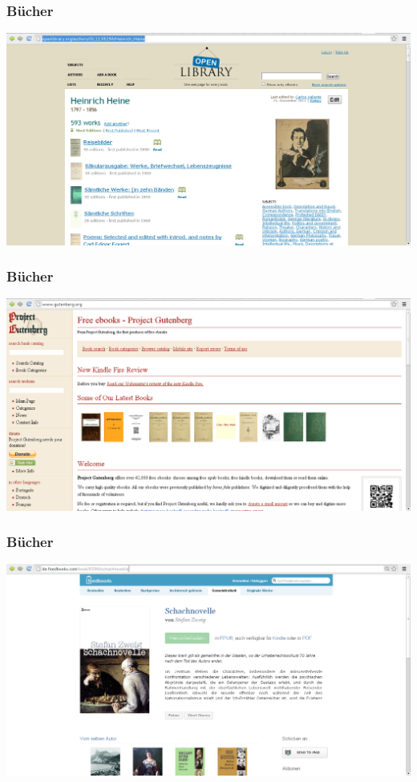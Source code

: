 \documentclass[table]{beamer}
\begin{document}
\begin{frame}
  \frametitle{Bücher}
  \includegraphics[width=\textwidth]{img/openlibrary.png}
\end{frame}

\begin{frame}
  \frametitle{Bücher}
  \includegraphics[width=\textwidth]{img/gutenberg.png}
\end{frame}

\begin{frame}
  \frametitle{Bücher}
  \includegraphics[width=\textwidth]{img/feedbooks.png}
\end{frame}
\end{document}
